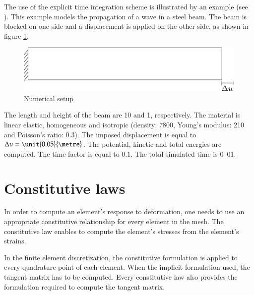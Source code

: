 The use of the explicit time integration scheme is illustrated by an
example (see ).  This
example models the propagation of a wave in a steel beam. The beam is
blocked on one side and a displacement is applied on the other side,
as shown in figure \ref{fig:smm:explicit}.

\begin{figure}[!htb] \centering
  \includegraphics[scale=.6]{figures/explicit_dynamic}
  \caption{Numerical setup \label{fig:smm:explicit}}
\end{figure}

The length and height of the beam are \unit{10}{\metre} and
\unit{1}{\metre}, respectively.  The material is linear elastic,
homogeneous and isotropic (density:
\unit{7800}{\kilogrampercubicmetre}, Young's modulus:
\unit{210}{\giga\pascal} and Poisson's ratio: $0.3$).  The imposed
displacement is equal to $\Delta u = \unit{0.05}{\metre}$. The
potential, kinetic and total energies are computed.  The time factor
is equal to $0.1$.  The total simulated time is \unit{0.01}{\second}.

\section{Constitutive laws \label{sect:smm:CL}} 
In order to compute an element's response to deformation, one needs to
use an appropriate constitutive relationship for every element in the
mesh. The constitutive law enables to compute the element's stresses
from the element's strains.

In the finite element discretization, the constitutive formulation is
applied to every quadrature point of each element. When the implicit
formulation used, the tangent matrix has to be computed. Every
constitutive law also provides the formulation required to compute the
tangent matrix.

